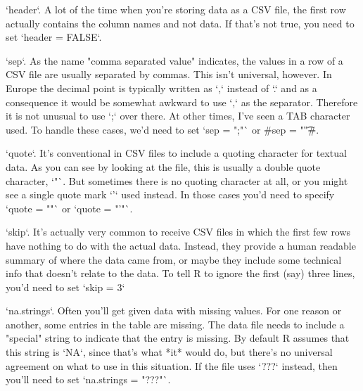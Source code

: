 \item `header`. A lot of the time when you're storing data as a CSV file, the first row actually contains the column names and not data. If that's not true, you need to set `header = FALSE`. 
\item `sep`. As the name "comma separated value" indicates, the values in a row of a CSV file are usually separated by commas. This isn't universal, however. In Europe the decimal point is typically written as `,` instead of `.` and as a consequence it would be somewhat awkward to use `,` as the separator. Therefore it is not unusual to use `;` over there. At other times, I've seen a TAB character used. To handle these cases, we'd need to set `sep = ";"` or \rtextverb#sep = "\t"#.  
\item `quote`. It's conventional in CSV files to include a quoting character for textual data. As you can see by looking at the  file, this is usually a double quote character, `"`. But sometimes there is no quoting character at all, or you might see a single quote mark `'` used instead. In those cases you'd need to specify `quote = ""` or `quote = "'"`. 
\item `skip`. It's actually very common to receive CSV files in which the first few rows have nothing to do with the actual data. Instead, they provide a human readable summary of where the data came from, or maybe they include some technical info that doesn't relate to the data. To tell R to ignore the first (say) three lines, you'd need to set `skip = 3`
\item `na.strings`. Often you'll get given data with missing values. For one reason or another, some entries in the table are missing. The data file needs to include a "special" string to indicate that the entry is missing. By default R assumes that this string is `NA`, since that's what *it* would do, but there's no universal agreement on what to use in this situation. If the file uses `???` instead, then you'll need to set `na.strings = "???"`. 


